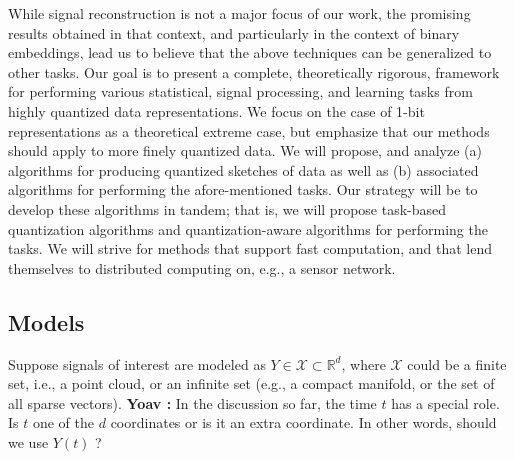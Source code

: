 \documentclass{article}
\newcommand{\comment}[3]{{\color{#1} {\bf #2 :} #3}}
\newcommand{\yoav}[1]{\comment{magenta}{Yoav}{#1}}
\newcommand{\rayan}[1]{\comment{red}{Rayan}{#1}}
\begin{document}
While signal reconstruction is not a major focus of our work, the promising results obtained in that context, and particularly in the context of binary embeddings, lead us to believe that the above techniques can be generalized to other tasks. 
Our goal  is to present a complete, theoretically rigorous, framework for performing various statistical, signal processing, and learning tasks from highly quantized data representations. We focus on the case of 1-bit representations as a theoretical extreme case, but emphasize that our methods should apply to more finely quantized data. We will propose, and analyze  (a) algorithms for  producing quantized sketches of data as well as (b) associated algorithms for performing the afore-mentioned tasks. Our strategy will be to develop these algorithms in tandem; that is, we will propose task-based quantization algorithms and quantization-aware algorithms for performing the tasks. We will strive for methods that support fast computation, and that lend themselves to distributed computing on, e.g., a sensor network.

\subsection{Models}
\newcommand{\transfer}{\phi}
  
Suppose signals of interest are modeled as $Y\in \mathcal{X} \subset
\mathbb{R}^d$, where $\mathcal{X}$ could be a finite set, i.e., a
point cloud, or an infinite set (e.g., a compact manifold, or the set
of all sparse vectors).
\yoav{In the discussion so far, the time $t$
  has a special role. Is $t$ one of the $d$ coordinates or is it an
  extra coordinate. In other words, should we use $Y(t)$ ?}
\end{document}
